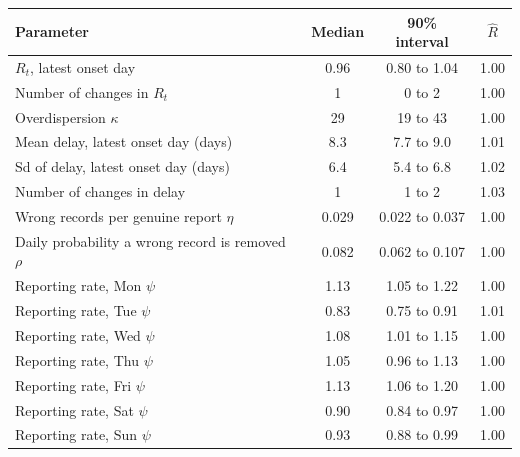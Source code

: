 \begin{tabular}{lccc}
\toprule
Parameter & Median & 90\% interval & $\hat{R}$ \\
\midrule
$R_t$, latest onset day & 0.96 & 0.80 to 1.04 & 1.00 \\
Number of changes in $R_t$ & 1 & 0 to 2 & 1.00 \\
Overdispersion $\kappa$ & 29 & 19 to 43 & 1.00 \\
Mean delay, latest onset day (days) & 8.3 & 7.7 to 9.0 & 1.01 \\
Sd of delay, latest onset day (days) & 6.4 & 5.4 to 6.8 & 1.02 \\
Number of changes in delay & 1 & 1 to 2 & 1.03 \\
Wrong records per genuine report $\eta$ & 0.029 & 0.022 to 0.037 & 1.00 \\
Daily probability a wrong record is removed $\rho$ & 0.082 & 0.062 to 0.107 & 1.00 \\
Reporting rate, Mon $\psi$ & 1.13 & 1.05 to 1.22 & 1.00 \\
Reporting rate, Tue $\psi$ & 0.83 & 0.75 to 0.91 & 1.01 \\
Reporting rate, Wed $\psi$ & 1.08 & 1.01 to 1.15 & 1.00 \\
Reporting rate, Thu $\psi$ & 1.05 & 0.96 to 1.13 & 1.00 \\
Reporting rate, Fri $\psi$ & 1.13 & 1.06 to 1.20 & 1.00 \\
Reporting rate, Sat $\psi$ & 0.90 & 0.84 to 0.97 & 1.00 \\
Reporting rate, Sun $\psi$ & 0.93 & 0.88 to 0.99 & 1.00 \\
\bottomrule
\end{tabular}
